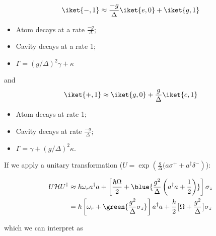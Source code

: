  \begin{equation}
   \iket{-,1} \approx \frac{-g}{\Delta}\iket{e,0} + \iket{g,1}
 \end{equation}

 \begin{itemize}
 \item Atom decays at a rate $\frac{-g}{\Delta}$;
 \item Cavity decays at a rate 1;
 \item $\Gamma = (g/\Delta)^2\gamma+\kappa$
 \end{itemize}

 and
 \begin{equation}
   \iket{+,1} \approx  \iket{g,0}  +
   \frac{g}{\Delta}\iket{e,1}
 \end{equation}

 \begin{itemize}
 \item Atom decays at rate 1;
 \item Cavity decays at rate $\frac{-g}{\Delta}$;
 \item $\Gamma = \gamma+ (g/\Delta)^2\kappa$.
 \end{itemize}

 \noindent       If      we       apply       a      unitary       transformation
 ($U = \exp \left( \frac{g}{\Delta}(a\sigma^+ + a^{\dagger}\delta^{-} \right)$):

 \begin{equation}\label{eq:resonator-stark-shift}
   \begin{aligned}
     U\mathcal{H}U^{\dagger} & \approx \hbar\omega_ra^{\dag}a + \left[\frac{\hbar\Omega}{2} + \blue{\frac{g^{2}}{\Delta}\left( a^{\dagger}a + \frac{1}{2} \right)} \right]\sigma_z \\
     &   =    \hbar   \left[   \omega_r    +   \green{\frac{g^2}{\Delta}\sigma_z}
     \right]a^{\dagger}       a        +       \frac{\hbar}{2}\big[\Omega       +
     \frac{g^2}{\Delta}\big]\sigma_z
   \end{aligned}
 \end{equation}

 \noindent which we can interpret as

